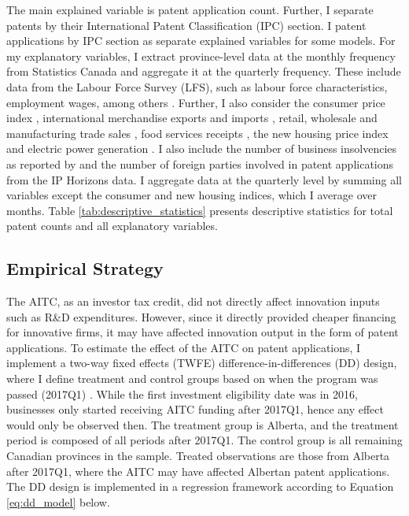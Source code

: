 \documentclass[../main.tex]{subfiles}
\begin{document}
The main explained variable is patent application count. Further, I separate patents by their International Patent Classification (IPC) section. I patent applications by IPC section as separate explained variables for some models. For my explanatory variables, I extract province-level data at the monthly frequency from Statistics Canada and aggregate it at the quarterly frequency. These include data from the Labour Force Survey (LFS), such as labour force characteristics, employment wages, among others \parencite*{lfs_lfc_table,lfs_employee_wages,statisticscanada24,statisticscanada24b}. Further, I also consider the consumer price index \parencite*{cpi}, international merchandise exports and imports \parencite*{statisticscanada24g}, retail, wholesale and manufacturing trade sales \parencite*{retail_trade_sales,wholesale_trade,manufacturing_sales}, food services receipts \parencite*{statisticscanada24c}, the new housing price index \parencite*{statisticscanada24a} and electric power generation \parencite*{statisticscanada24f,statisticscanada08}. I also include the number of business insolvencies as reported by \textcite{insolvency24} and the number of foreign parties involved in patent applications from the IP Horizons data. I aggregate data at the quarterly level by summing all variables except the consumer and new housing indices, which I average over months. Table \ref{tab:descriptive_statistics} presents descriptive statistics for total patent counts and all explanatory variables.

\subsection{Empirical Strategy}
The AITC, as an investor tax credit, did not directly affect innovation inputs such as R\&D expenditures. However, since it directly provided cheaper financing for innovative firms, it may have affected innovation output in the form of patent applications. To estimate the effect of the AITC on patent applications, I implement a two-way fixed effects (TWFE) difference-in-differences (DD) design, where I define treatment and control groups based on when the program was passed (2017Q1) \parencite{albertaeconomicdevelopmentandtrade17}. While the first investment eligibility date was in 2016, businesses only started receiving AITC funding after 2017Q1, hence any effect would only be observed then. The treatment group is Alberta, and the treatment period is composed of all periods after 2017Q1. The control group is all remaining Canadian provinces in the sample. Treated observations are those from Alberta after 2017Q1, where the AITC may have affected Albertan patent applications. The DD design is implemented in a regression framework according to Equation \ref{eq:dd_model} below.
\end{document}
